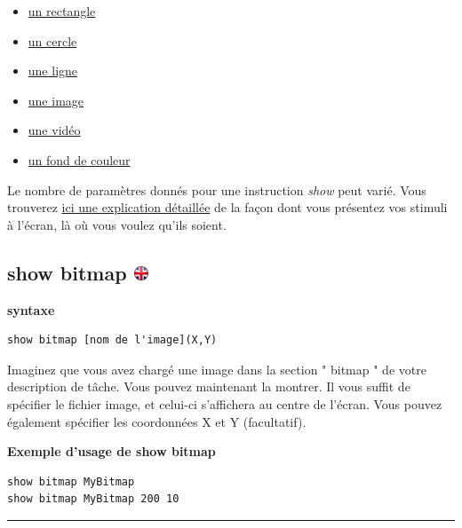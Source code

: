 \documentclass[
]{book}
\providecommand{\tightlist}{%
  \setlength{\itemsep}{0pt}\setlength{\parskip}{0pt}}
\begin{document}
\begin{itemize}
\tightlist
\item
  \protect\hyperlink{task-show-rectangle}{un rectangle}
\item
  \protect\hyperlink{task-show-circle}{un cercle}
\item
  \protect\hyperlink{task-show-text}{une ligne}
\item
  \protect\hyperlink{task-show-bitmap}{une image}
\item
  \protect\hyperlink{task-show-video}{une vidéo}
\item
  \protect\hyperlink{task-show-background}{un fond de couleur}
\end{itemize}

Le nombre de paramètres donnés pour une instruction \emph{show} peut
varié. Vous trouverez \protect\hyperlink{s4-2}{ici une explication
détaillée} de la façon dont vous présentez vos stimuli à l'écran, là où
vous voulez qu'ils soient.

\hypertarget{show-bitmap}{%
\subsection[show bitmap ]{\texorpdfstring{show bitmap
\href{https://www.psytoolkit.org/doc3.2.0/syntax.html\#task-show-bitmap}{\protect\includegraphics{img/ukflag.png}}}{show bitmap }}\label{show-bitmap}}

\textbf{syntaxe}

\begin{verbatim}
show bitmap [nom de l'image](X,Y)
\end{verbatim}

Imaginez que vous avez chargé une image dans la section " bitmap " de
votre description de tâche. Vous pouvez maintenant la montrer. Il vous
suffit de spécifier le fichier image, et celui-ci s'affichera au centre
de l'écran. Vous pouvez également spécifier les coordonnées X et Y
(facultatif).

\textbf{Exemple d'usage de show bitmap}

\begin{verbatim}
show bitmap MyBitmap
show bitmap MyBitmap 200 10
\end{verbatim}

\begin{center}\rule{0.5\linewidth}{\linethickness}\end{center}
\end{document}
